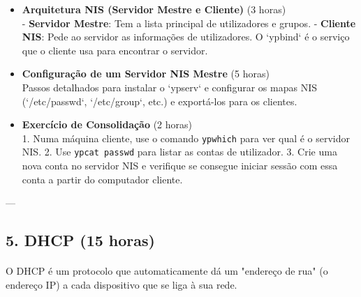 \documentclass[10pt,a4paper]{article}
\begin{document}
	\begin{itemize}
		\item \textbf{Arquitetura NIS (Servidor Mestre e Cliente)} (3 horas) \\
		- \textbf{Servidor Mestre}: Tem a lista principal de utilizadores e grupos.
		- \textbf{Cliente NIS}: Pede ao servidor as informações de utilizadores. O `ypbind` é o serviço que o cliente usa para encontrar o servidor.
		
		\item \textbf{Configuração de um Servidor NIS Mestre} (5 horas) \\
		Passos detalhados para instalar o `ypserv` e configurar os mapas NIS (`/etc/passwd`, `/etc/group`, etc.) e exportá-los para os clientes.
		
		\item \textbf{Exercício de Consolidação} (2 horas) \\
		1. Numa máquina cliente, use o comando \texttt{ypwhich} para ver qual é o servidor NIS.
		2. Use \texttt{ypcat passwd} para listar as contas de utilizador.
		3. Crie uma nova conta no servidor NIS e verifique se consegue iniciar sessão com essa conta a partir do computador cliente.
	\end{itemize}
	
	---
	
	\subsection*{5. DHCP (15 horas)}
	\vspace{-1.2em}
	\paragraph{}
	O DHCP é um protocolo que automaticamente dá um "endereço de rua" (o endereço IP) a cada dispositivo que se liga à sua rede.
	
\end{document}
